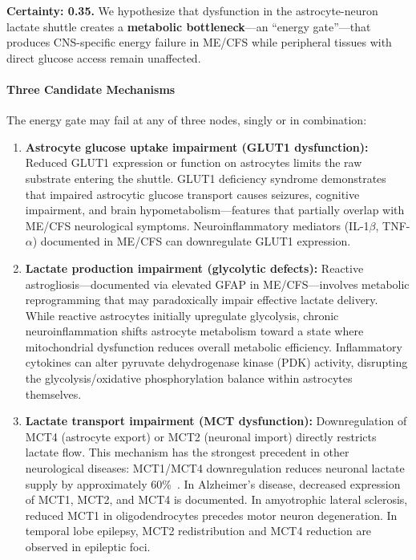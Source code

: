 \begin{speculation}
\label{spec:astrocyte-energy-gate}
\textbf{Certainty: 0.35.} We hypothesize that dysfunction in the astrocyte-neuron lactate shuttle creates a \textbf{metabolic bottleneck}---an ``energy gate''---that produces CNS-specific energy failure in ME/CFS while peripheral tissues with direct glucose access remain unaffected.

\paragraph{Three Candidate Mechanisms}

The energy gate may fail at any of three nodes, singly or in combination:

\begin{enumerate}
    \item \textbf{Astrocyte glucose uptake impairment (GLUT1 dysfunction):} Reduced GLUT1 expression or function on astrocytes limits the raw substrate entering the shuttle. GLUT1 deficiency syndrome demonstrates that impaired astrocytic glucose transport causes seizures, cognitive impairment, and brain hypometabolism---features that partially overlap with ME/CFS neurological symptoms. Neuroinflammatory mediators (IL-1$\beta$, TNF-$\alpha$) documented in ME/CFS can downregulate GLUT1 expression.

    \item \textbf{Lactate production impairment (glycolytic defects):} Reactive astrogliosis---documented via elevated GFAP in ME/CFS---involves metabolic reprogramming that may paradoxically impair effective lactate delivery. While reactive astrocytes initially upregulate glycolysis, chronic neuroinflammation shifts astrocyte metabolism toward a state where mitochondrial dysfunction reduces overall metabolic efficiency. Inflammatory cytokines can alter pyruvate dehydrogenase kinase (PDK) activity, disrupting the glycolysis/oxidative phosphorylation balance within astrocytes themselves.

    \item \textbf{Lactate transport impairment (MCT dysfunction):} Downregulation of MCT4 (astrocyte export) or MCT2 (neuronal import) directly restricts lactate flow. This mechanism has the strongest precedent in other neurological diseases: MCT1/MCT4 downregulation reduces neuronal lactate supply by approximately 60\%~\cite{Kim2025ANLS}. In Alzheimer's disease, decreased expression of MCT1, MCT2, and MCT4 is documented. In amyotrophic lateral sclerosis, reduced MCT1 in oligodendrocytes precedes motor neuron degeneration. In temporal lobe epilepsy, MCT2 redistribution and MCT4 reduction are observed in epileptic foci.
\end{enumerate}


\end{speculation}
